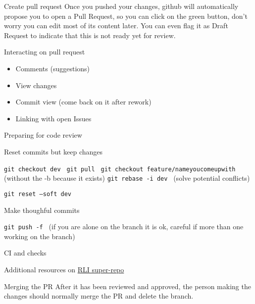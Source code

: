 \documentclass{beamer}
\begin{document}
\begin{frame}{Create pull request}
Once you pushed your changes, github will automatically propose you to open a Pull Request, so you can click on the green button, don't worry you can edit most of its content later. You can even flag it as Draft Request to indicate that this is not ready yet for review.
\end{frame}

\begin{frame}{Interacting on pull request}
\begin{itemize}
 \item Comments (suggestions)
 \item View changes
 \item Commit view (come back on it after rework)
 \item Linking with open Issues
\end{itemize}

\end{frame}

\begin{frame}{Preparing for code review}

Reset commits but keep changes

{\tt git checkout dev }
{\tt git pull }
{\tt git checkout feature/nameyoucomeupwith }(without the -b because it exists)
{\tt git rebase -i dev }
(solve potential conflicts)

{\tt git reset --soft dev } 


Make thoughful commits

{\tt git push -f } (if you are alone on the branch it is ok, careful if more than one working on the branch)

\end{frame}

\begin{frame}{CI and checks}

Additional resources on \href{https://github.com/rl-institut/super-repo}{RLI super-repo}

\end{frame}

\begin{frame}{Merging the PR}
After it has been reviewed and approved, the person making the changes should normally merge the PR and delete the branch.

\end{frame}
\end{document}
